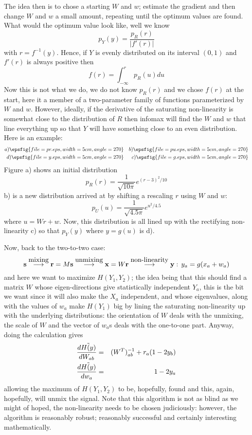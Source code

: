 \documentclass[12pt]{article}
\begin{document}
The idea then is to chose a starting $W$ and $w$; estimate the
gradient and then change $W$ and $w$ a small amount, repeating until
the optimum values are found. What would the optimum value look like, well we know
\begin{equation}
p_Y(y)=\frac{p_R(r)}{|f'(r)|}
\end{equation}
with $r=f^{-1}(y)$. Hence, if $Y$ is evenly distributed on its interval $(0,1)$ and $f'(r)$ is always positive then
\begin{equation}
f(r)=\int_{-\infty}^rp_R(u)du
\end{equation}
Now this is not what we do, we do not know $p_R(r)$ and we chose
$f(r)$ at the start, here it a member of a two-parameter family of
functions parameterized by $W$ and $w$. However, ideally, if the
derivative of the saturating non-linearity is somewhat close to the
distribution of $R$ then infomax will find the $W$ and $w$ that line
everything up so that $Y$ will have something close to an even
distribution. Here is an example:
\begin{eqnarray}
a)\epsfig{file=pr.eps,width=5cm,angle=270}&&b)\epsfig{file=pu.eps,width=5cm,angle=270}\cr
d)\epsfig{file=y.eps,width=5cm,angle=270}&&c)\epsfig{file=g.eps,width=5cm,angle=270}
\end{eqnarray}
Figure a) shows an initial distribution 
\begin{equation}
p_R(r)=\frac{1}{\sqrt{10\pi}}e^{(r-3)^2/10}
\end{equation}
b) is a new distribution arrived at by shifting a rescaling $r$ using $W$ and $w$:
\begin{equation}
p_U(u)=\frac{1}{\sqrt{4.5\pi}}e^{u^2/4.5}
\end{equation}
where $u=Wr+w$. Now, this distribution is all lined up with the
rectifying non-linearity c) so that $p_Y(y)$ where $y=g(u)$ is d).

Now, back to the two-to-two case: 
\begin{equation}
{\bf s}\stackrel{\mbox{mixing}}{\longrightarrow}{\bf r}=M{\bf s}\stackrel{\mbox{unmixing}}{\longrightarrow}{\bf x}=W{\bf r}\stackrel{\mbox{non-linearity}}{\longrightarrow}{\bf y}:\,y_a=g(x_a+w_a)
\end{equation}
and here we want to maximize $H(Y_1,Y_2)$; the idea being that this
should find a matrix $W$ whose eigen-directions give statistically
independent $Y_a$, this is the bit we want since it will also make the
$X_a$ independent, and whose eigenvalues, along with the values of
$w_a$ make $H(Y_1)$ big by lining the saturating non-linearity up with
the underlying distributions: the orientation of $W$ deals with the
unmixing, the scale of $W$ and the vector of $w_a$s deals with the
one-to-one part. Anyway, doing the calculation gives 
\begin{eqnarray}
\frac{d\tilde{H(y)}}{dW_{ab}}&=&(W^T)^{-1}_{ab}+r_a(1-2y_b)\cr
\frac{d\tilde{H(y)}}{dw_a}&=&1-2y_a
\end{eqnarray}
allowing the maximum of $H(Y_1,Y_2)$ to be, hopefully, found and this,
again, hopefully, will unmix the signal. Note that this algorithm is
not as blind as we might of hoped, the non-linearity needs to be
chosen judiciously: however, the algorithm is reasonably robust;
reasonably successful and certainly interesting mathematically.
\end{document}
